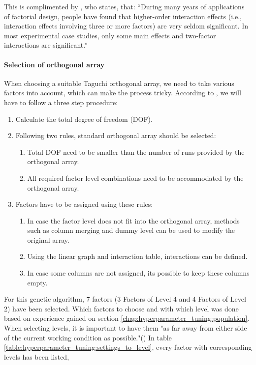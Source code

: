 This is complimented by \cite{yang_design_2009}, who states, that:
\enquote{During many years of applications of factorial design, people have found that higher-order interaction effects (i.e., interaction effects involving three or more factors) are very seldom significant. In most experimental case studies, only some main effects and two-factor interactions are significant.}

\paragraph{Selection of orthogonal array}
When choosing a suitable Taguchi orthogonal array, we need to take various factors into account, which can make the process tricky. According to \cite{yang_design_2009}, we will have to follow a three step procedure:

\begin{enumerate}
	\item Calculate the total degree of freedom (DOF). 
	\item Following two rules, standard orthogonal array should be selected:
	\begin{enumerate}
		\item Total DOF need to be smaller than the number of runs provided by the orthogonal array.
		\item All required factor level combinations need to be accommodated by the orthogonal array.
	\end{enumerate}
	
	\item Factors have to be assigned using these rules: 
	\begin{enumerate}
		\item In case the factor level does not fit into the orthogonal array, methods such as column merging and dummy level can be used to modify the original array.
		\item Using the linear graph and interaction table, interactions can be defined. 
		\item In case some columns are not assigned, its possible to keep these columns empty.
	\end{enumerate}
\end{enumerate}


For this genetic algorithm, 7 factors (3 Factors of Level 4 and 4 Factors of Level 2) have been selected. Which factors to choose and with which level was done based on experience gained on section \ref{chap:hyperparameter_tuning:population}. When selecting levels, it is important to have them "as far away from either side of the current working condition as possible."(\cite{roy_primer_1990})
In table \ref{table:hyperparameter_tuning:settings_to_level}, every factor with corresponding levels has been listed,

